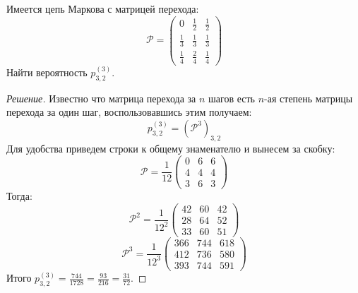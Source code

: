 \documentclass[12pt,a4paper]{article}
\author{Самутичев Е.Р.}
\date{\today}
\title{}
\begin{document}
	
\maketitle

\begin{exercise}[Задача 1]
	Имеется цепь Маркова с матрицей перехода:
	$$\mathcal{P} = \begin{pmatrix}
			0 & \frac{1}{2} & \frac{1}{2} \\[4pt]
			\frac{1}{3} & \frac{1}{3} & \frac{1}{3} \\[4pt]
			\frac{1}{4} & \frac{2}{4} & \frac{1}{4}
		\end{pmatrix}$$
	Найти вероятность $p_{3,2}^{(3)}$.
\end{exercise}
\begin{proof}[Решение]
	Известно что матрица перехода за $n$ шагов есть $n$-ая степень матрицы перехода за один шаг, воспользовавшись этим получаем:
	$$p_{3, 2}^{(3)} = (\mathcal{P}^3)_{3, 2}$$
	Для удобства приведем строки к общему знаменателю и вынесем за скобку:
	$$\mathcal{P} = \frac{1}{12} \begin{pmatrix}
		0 & 6 & 6 \\
		4 & 4 & 4 \\
		3 & 6 & 3
	\end{pmatrix}$$
	Тогда:
	$$\mathcal{P}^2 = \frac{1}{12^2} \begin{pmatrix}
		42 & 60 & 42 \\
		28 & 64 & 52 \\
		33 & 60 & 51
	\end{pmatrix}$$
	$$\mathcal{P}^3 = \frac{1}{12^3} \begin{pmatrix}
		366 & 744 & 618 \\
		412 & 736 & 580 \\
		393 & 744 & 591
	\end{pmatrix}$$
	Итого $p_{3, 2}^{(3)} = \frac{744}{1728} = \frac{93}{216} = \frac{31}{72}$.
\end{proof}
\end{document}
